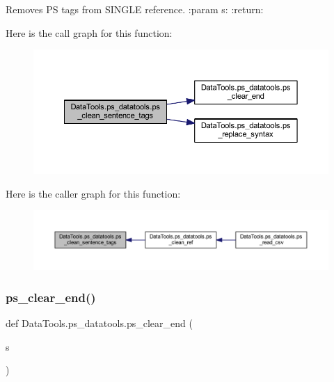 \begin{DoxyVerb}Removes PS tags from SINGLE reference.
:param s:
:return:
\end{DoxyVerb}
 Here is the call graph for this function\+:
\nopagebreak
\begin{figure}[H]
\begin{center}
\leavevmode
\includegraphics[width=350pt]{namespace_data_tools_1_1ps__datatools_a9e2bdb845162499b6c7ef07092fa76e0_cgraph}
\end{center}
\end{figure}
Here is the caller graph for this function\+:
\nopagebreak
\begin{figure}[H]
\begin{center}
\leavevmode
\includegraphics[width=350pt]{namespace_data_tools_1_1ps__datatools_a9e2bdb845162499b6c7ef07092fa76e0_icgraph}
\end{center}
\end{figure}
\mbox{\label{namespace_data_tools_1_1ps__datatools_aa1f7c645ca04ccce524923614553e377}} 
\subsubsection{\texorpdfstring{ps\+\_\+clear\+\_\+end()}{ps\_clear\_end()}}
{\footnotesize\ttfamily def Data\+Tools.\+ps\+\_\+datatools.\+ps\+\_\+clear\+\_\+end (\begin{DoxyParamCaption}\item[{}]{s }\end{DoxyParamCaption})}

